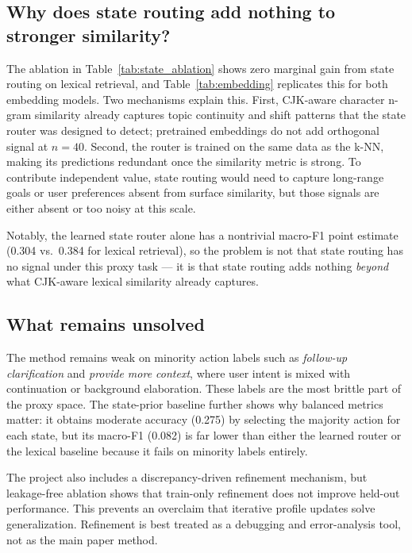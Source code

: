 \subsection{Why does state routing add nothing to stronger similarity?}

The ablation in Table~\ref{tab:state_ablation} shows zero marginal gain from state routing on lexical retrieval, and Table~\ref{tab:embedding} replicates this for both embedding models. Two mechanisms explain this. First, CJK-aware character n-gram similarity already captures topic continuity and shift patterns that the state router was designed to detect; pretrained embeddings do not add orthogonal signal at $n=40$. Second, the router is trained on the same data as the k-NN, making its predictions redundant once the similarity metric is strong. To contribute independent value, state routing would need to capture long-range goals or user preferences absent from surface similarity, but those signals are either absent or too noisy at this scale.

Notably, the learned state router alone has a nontrivial macro-F1 point estimate (0.304 vs.\ 0.384 for lexical retrieval), so the problem is not that state routing has no signal under this proxy task — it is that state routing adds nothing \emph{beyond} what CJK-aware lexical similarity already captures.

\subsection{What remains unsolved}

The method remains weak on minority action labels such as \emph{follow-up clarification} and \emph{provide more context}, where user intent is mixed with continuation or background elaboration. These labels are the most brittle part of the proxy space. The state-prior baseline further shows why balanced metrics matter: it obtains moderate accuracy (0.275) by selecting the majority action for each state, but its macro-F1 (0.082) is far lower than either the learned router or the lexical baseline because it fails on minority labels entirely.

The project also includes a discrepancy-driven refinement mechanism, but leakage-free ablation shows that train-only refinement does not improve held-out performance. This prevents an overclaim that iterative profile updates solve generalization. Refinement is best treated as a debugging and error-analysis tool, not as the main paper method.

